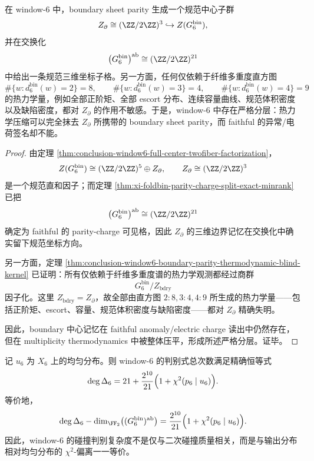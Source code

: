\begin{corollary}\label{cor:conclusion-window6-thermodynamic-visibility-vs-central-memory-stratification}
在 window-\(6\) 中，boundary sheet parity 生成一个规范中心子群
\[
Z_{\partial}\cong (\ZZ/2\ZZ)^3\hookrightarrow Z(G_6^{\mathrm{bin}}),
\]
并在交换化
\[
\bigl(G_6^{\mathrm{bin}}\bigr)^{\mathrm{ab}}\cong (\ZZ/2\ZZ)^{21}
\]
中给出一条规范三维坐标子格。另一方面，任何仅依赖于纤维多重度直方图
\[
\#\{w:d_6^{\mathrm{bin}}(w)=2\}=8,\qquad
\#\{w:d_6^{\mathrm{bin}}(w)=3\}=4,\qquad
\#\{w:d_6^{\mathrm{bin}}(w)=4\}=9
\]
的热力学量，例如全部正阶矩、全部 escort 分布、连续容量曲线、规范体积密度以及缺陷密度，都对 \(Z_{\partial}\) 的作用不敏感。于是，window-\(6\) 中存在严格分层：热力学压缩可以完全抹去 \(Z_{\partial}\) 所携带的 boundary sheet parity，而 faithful 的异常/电荷签名却不能。
\end{corollary}

\begin{proof}
由定理 \ref{thm:conclusion-window6-full-center-twofiber-factorization}，
\[
Z(G_6^{\mathrm{bin}})
\cong
(\ZZ/2\ZZ)^5\oplus Z_{\partial},
\qquad
Z_{\partial}\cong (\ZZ/2\ZZ)^3
\]
是一个规范直和因子；而定理 \ref{thm:xi-foldbin-parity-charge-split-exact-minrank} 已把
\[
\bigl(G_6^{\mathrm{bin}}\bigr)^{\mathrm{ab}}
\cong
(\ZZ/2\ZZ)^{21}
\]
确定为 faithful 的 parity-charge 可见格，因此 \(Z_{\partial}\) 的三维边界记忆在交换化中确实留下规范坐标方向。

另一方面，定理 \ref{thm:conclusion-window6-boundary-parity-thermodynamic-blind-kernel} 已证明：所有仅依赖于纤维多重度谱的热力学观测都经过商群
\[
G_6^{\mathrm{bin}}/Z_{\mathrm{bdry}}
\]
因子化。这里 \(Z_{\mathrm{bdry}}=Z_{\partial}\)，故全部由直方图 \(2{:}8,3{:}4,4{:}9\) 所生成的热力学量——包括正阶矩、escort、容量、规范体积密度与缺陷密度——都对 \(Z_{\partial}\) 精确失明。

因此，boundary 中心记忆在 faithful anomaly/electric charge 读出中仍然存在，但在 multiplicity thermodynamics 中被整体压平，形成所述严格分层。证毕。
\end{proof}

\begin{theorem}\label{thm:conclusion-window6-discriminant-degree-chi-square-affine-lift}
记 \(u_6\) 为 \(X_6\) 上的均匀分布。则 window-\(6\) 的判别式总次数满足精确恒等式
\[
\deg\Delta_6
=
21+\frac{2^{10}}{21}\Bigl(1+\chi^2(p_6\mid u_6)\Bigr).
\]
等价地，
\[
\deg\Delta_6-\dim_{\FF_2}\bigl((G_6^{\mathrm{bin}})^{\mathrm{ab}}\bigr)
=
\frac{2^{10}}{21}\Bigl(1+\chi^2(p_6\mid u_6)\Bigr).
\]
因此，window-\(6\) 的碰撞判别复杂度不是仅与二次碰撞质量相关，而是与输出分布相对均匀分布的 \(\chi^2\)-偏离一一等价。
\end{theorem}

